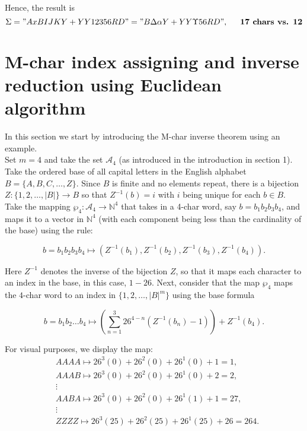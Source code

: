 \documentclass[amsmath,12pt,a4paper]{amsart}
\begin{document}
Hence, the result is
$$
\Sigma = "AxBIJKY + YY12356RD" = "B\Delta \alpha Y + YY \Upsilon 56RD",\indent \textbf{17 chars vs. 12}
$$

\section{M-char index assigning and inverse reduction using Euclidean algorithm}
In this section we start by introducing the M-char inverse theorem using an example.\\

Set $m = 4$ and take the set $\mathcal{A}_4$ (as introduced in the introduction in section 1). Take the ordered base of all capital letters in the English alphabet $B = \{A, B, C, \ldots, Z\}$. Since $B$ is finite and no elements repeat, there is a bijection $Z : \{1, 2, \ldots, |B|\} \to B$ so that $Z^{-1}(b) = i$ with $i$ being unique for each $b \in B$. Take the mapping $\wp_4 : \mathcal{A}_4 \to \mathbb{N}^4$ that takes in a 4-char word, say $b = b_1b_2b_3b_4$, and maps it to a vector in $\mathbb{N}^4$ (with each component being less than the cardinality of the base) using the rule:

$$
b = b_1b_2b_3b_4 \mapsto (Z^{-1}(b_1), Z^{-1}(b_2), Z^{-1}(b_3), Z^{-1}(b_4)).
$$

Here $Z^{-1}$ denotes the inverse of the bijection $Z$, so that it maps each character to an index in the base, in this case, $1 - 26$. Next, consider that the map $\wp_4$ maps the $4$-char word to an index in $\{1, 2, \ldots, |B|^m\}$ using the base formula

$$
b = b_1b_2\ldots b_4 \mapsto \left( \sum_{n=1}^{3} 26^{4-n} \left( Z^{-1}(b_n) - 1 \right) \right) + Z^{-1}(b_4).
$$

For visual purposes, we display the map:
$$\begin{aligned}
&AAAA \mapsto 26^3(0) + 26^2(0) + 26^1(0) + 1 = 1, \\
&AAAB \mapsto 26^3(0) + 26^2(0) + 26^1(0) + 2 = 2, \\
&\vdots \\
&AABA \mapsto 26^3(0) + 26^2(0) + 26^1(1) + 1 = 27, \\
&\vdots \\
&ZZZZ \mapsto 26^3(25) + 26^2(25) + 26^1(25) + 26 = 264.
\end{aligned}$$
\end{document}
